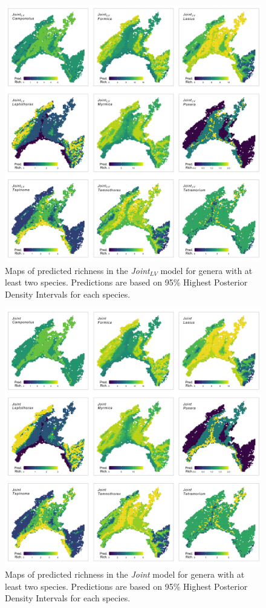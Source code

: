 \documentclass[preprint,review,times,12pt]{elsarticle}
\begin{document}
\begin{figure}
	\centering\includegraphics[width=6in]{ms/1_Ecography/1/figs/maps/gen_S_J+LV.png}
	\caption{\label{fig:gen_map_Joint_LV} Maps of predicted richness in the \emph{Joint}$_{LV}$ model for genera with at least two species. Predictions are based on 95\% Highest Posterior Density Intervals for each species. }
\end{figure}

\begin{figure}
	\centering\includegraphics[width=6in]{ms/1_Ecography/1/figs/maps/gen_S_J.png}
	\caption{\label{fig:gen_map_Joint} Maps of predicted richness in the \emph{Joint} model for genera with at least two species. Predictions are based on 95\% Highest Posterior Density Intervals for each species. }
\end{figure}
\end{document}
